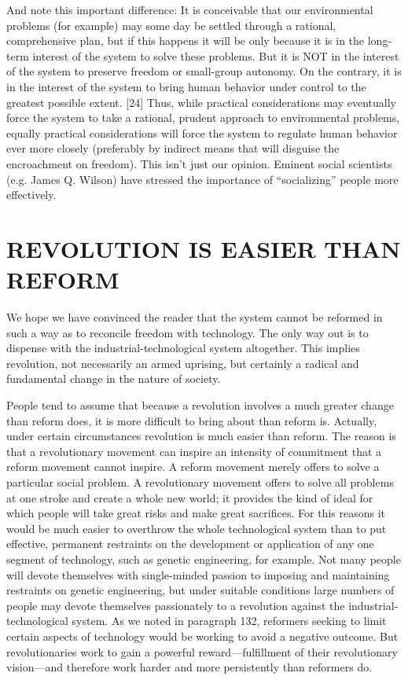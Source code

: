  And note this important difference: It is conceivable that our environmental problems (for example) may some day be settled through a rational, comprehensive plan, but if this happens it will be only because it is in the long-term interest of the system to solve these problems. But it is NOT in the interest of the system to preserve freedom or small-group autonomy. On the contrary, it is in the interest of the system to bring human behavior under control to the greatest possible extent. [24] Thus, while practical considerations may eventually force the system to take a rational, prudent approach to environmental problems, equally practical considerations will force the system to regulate human behavior ever more closely (preferably by indirect means that will disguise the encroachment on freedom). This isn’t just our opinion. Eminent social scientists (e.g. James Q. Wilson) have stressed the importance of “socializing” people more effectively.

\chapter{REVOLUTION IS EASIER THAN REFORM}

 We hope we have convinced the reader that the system cannot be reformed in such a way as to reconcile freedom with technology. The only way out is to dispense with the industrial-technological system altogether. This implies revolution, not necessarily an armed uprising, but certainly a radical and fundamental change in the nature of society.

 People tend to assume that because a revolution involves a much greater change than reform does, it is more difficult to bring about than reform is. Actually, under certain circumstances revolution is much easier than reform. The reason is that a revolutionary movement can inspire an intensity of commitment that a reform movement cannot inspire. A reform movement merely offers to solve a particular social problem. A revolutionary movement offers to solve all problems at one stroke and create a whole new world; it provides the kind of ideal for which people will take great risks and make great sacrifices. For this reasons it would be much easier to overthrow the whole technological system than to put effective, permanent restraints on the development or application of any one segment of technology, such as genetic engineering, for example. Not many people will devote themselves with single-minded passion to imposing and maintaining restraints on genetic engineering, but under suitable conditions large numbers of people may devote themselves passionately to a revolution against the industrial-technological system. As we noted in paragraph 132, reformers seeking to limit certain aspects of technology would be working to avoid a negative outcome. But revolutionaries work to gain a powerful reward—fulfillment of their revolutionary vision—and therefore work harder and more persistently than reformers do.


